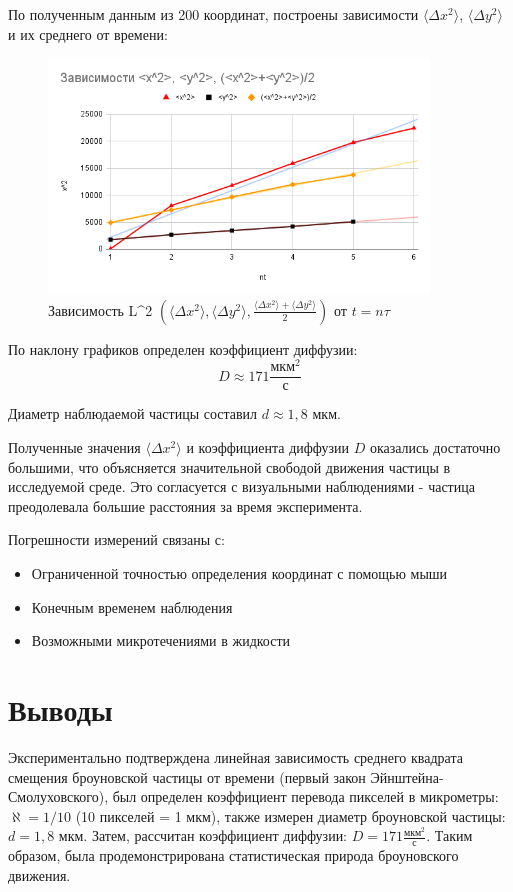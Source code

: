 \documentclass[a4paper,14pt]{article}
\begin{document}
По полученным данным из 200 координат, построены зависимости $\langle \Delta x^2 \rangle$, $\langle \Delta y^2 \rangle$ и их среднего от времени:

\begin{figure}[h]
    \centering
    \includegraphics[width=0.9\textwidth]{graph.png}
    \caption{Зависимость L^2 $\left(\langle \Delta x^2 \rangle, \langle \Delta y^2 \rangle, \frac{\langle \Delta x^2 \rangle + \langle \Delta y^2 \rangle}{2}\right)$ от $t=n\tau$}
    \label{fig:graph}
\end{figure}

По наклону графиков определен коэффициент диффузии:
$$ D \approx 171 \frac{\text{мкм}^2}{\text{с}} $$

Диаметр наблюдаемой частицы составил $d \approx 1,8$ мкм.

Полученные значения $\langle \Delta x^2 \rangle$ и коэффициента диффузии $D$ оказались достаточно большими, что объясняется значительной свободой движения частицы в исследуемой среде. Это согласуется с визуальными наблюдениями - частица преодолевала большие расстояния за время эксперимента.

Погрешности измерений связаны с:
\begin{itemize}
    \item Ограниченной точностью определения координат с помощью мыши
    \item Конечным временем наблюдения
    \item Возможными микротечениями в жидкости
\end{itemize}

\section{Выводы}
Экспериментально подтверждена линейная зависимость среднего квадрата смещения броуновской частицы от времени (первый закон Эйнштейна-Смолуховского), был определен коэффициент перевода пикселей в микрометры: $\aleph = 1/10$ (10 пикселей = 1 мкм), также измерен диаметр броуновской частицы: $d = 1,8$ мкм. Затем, рассчитан коэффициент диффузии: $D = 171 \frac{\text{мкм}^2}{\text{с}}$. Таким образом, была продемонстрирована статистическая природа броуновского движения.
\end{document}
